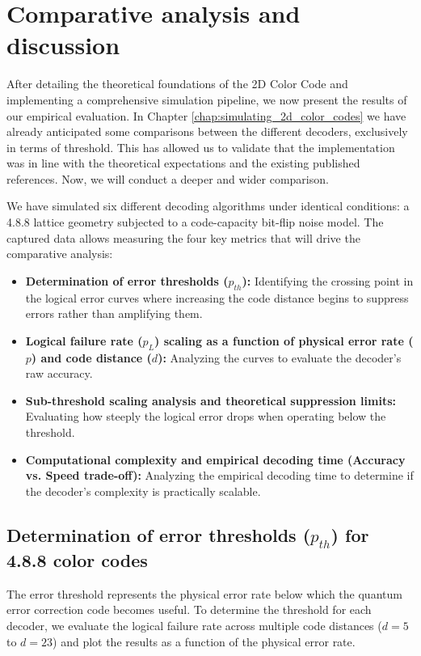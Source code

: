 \chapter{Comparative analysis and discussion}
\label{chap:comparative_analysis}

After detailing the theoretical foundations of the 2D Color Code and implementing a comprehensive simulation pipeline, we now present the results of our empirical evaluation. In Chapter \ref{chap:simulating_2d_color_codes} we have already anticipated some comparisons  between the different decoders, exclusively in terms of threshold. This has allowed us to validate that the implementation was in line with the theoretical expectations and the existing published references. Now, we will conduct a deeper and wider comparison. 

We have simulated six different decoding algorithms under identical conditions: a 4.8.8 lattice geometry subjected to a code-capacity bit-flip noise model. The captured data allows measuring the four key metrics that will drive the comparative analysis:

\begin{itemize}
    \item \textbf{Determination of error thresholds ($p_{th}$):} Identifying the crossing point in the logical error curves where increasing the code distance begins to suppress errors rather than amplifying them.
    \item \textbf{Logical failure rate ($p_L$) scaling as a function of physical error rate ($p$) and code distance ($d$):} Analyzing the curves to evaluate the decoder's raw accuracy.
    \item \textbf{Sub-threshold scaling analysis and theoretical suppression limits:} Evaluating how steeply the logical error drops when operating below the threshold.
    \item \textbf{Computational complexity and empirical decoding time (Accuracy vs. Speed trade-off):} Analyzing the empirical decoding time to determine if the decoder's complexity is practically scalable.
\end{itemize}

\section{Determination of error thresholds (\texorpdfstring{$p_{th}$}{pTH}) for 4.8.8 color codes}

The error threshold represents the physical error rate below which the quantum error correction code becomes useful. To determine the threshold for each decoder, we evaluate the logical failure rate across multiple code distances ($d=5$ to $d=23$) and plot the results as a function of the physical error rate. 

